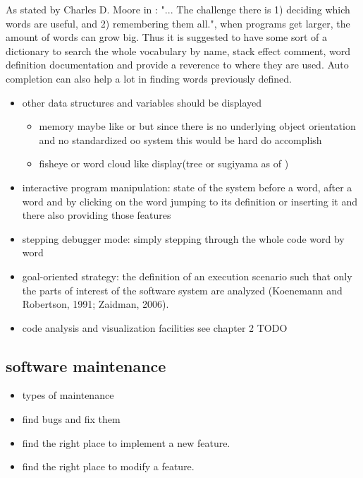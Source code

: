 As stated by \gls{Charles D. Moore} in \cite{Biancuzzi:2009:MPC:1592983}: "... The challenge there is 1) deciding
which words are useful, and 2) remembering them all.", when programs get larger, the amount of words can grow big. Thus it is suggested to have some sort of a dictionary to search the whole vocabulary by name, stack effect comment, word definition documentation and provide a reverence to where they are used. Auto completion can also help a lot in finding words previously defined.

\begin{itemize}

\item other data structures and variables should be displayed
	\begin{itemize}
	\item memory maybe like \cite{ReissProgrammingEnvironments1995} or \cite{Aftandilian:2010:HIH:1879211.1879222} but since there is no underlying object orientation and no standardized oo system this would be hard do accomplish
	\item fisheye or word cloud like display(tree or sugiyama as of \cite{Storey:1997:IVT:857188.857642})
	\end{itemize}


\item interactive program manipulation: state of the system before a word, after a word and by clicking on the word jumping to its definition or inserting it and there also providing those features

\item stepping debugger mode: simply stepping through the whole code word by word

\item goal-oriented strategy: the definition of an execution scenario such that only the parts of interest of the software system are analyzed (Koenemann and Robertson, 1991; Zaidman,
2006).

\item code analysis and visualization facilities see chapter 2 TODO
\end{itemize}

\subsection{software maintenance}

\begin{itemize}
\item types of maintenance
\item find bugs and fix them
\item find the right place to implement a new feature.
\item find the right place to modify a feature.
\end{itemize}

